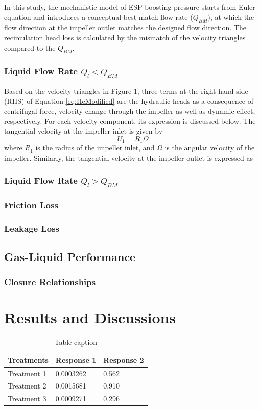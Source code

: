 \documentclass[preprint,12pt]{elsarticle}
\begin{document}
In this study, the mechanistic model of ESP boosting pressure starts from Euler equation and introduces a conceptual best match flow rate ($Q_{BM}$), at which the flow direction at the impeller outlet matches the designed flow direction. The recirculation head loss is calculated by the mismatch of the velocity triangles compared to the $Q_{BM}$.

\subsubsection{Liquid Flow Rate $Q_l < Q_{BM}$}
Based on the velocity triangles in Figure 1, three terms at the right-hand side (RHS) of Equation \ref{eq:HeModified} are the hydraulic heads as a consequence of centrifugal force, velocity change through the impeller as well as dynamic effect, respectively. For each velocity component, its expression is discussed below. The tangential velocity at the impeller inlet is given by
\begin{equation}
    \label{eq:U1}
    U_1=R_1\Omega
\end{equation}
where $R_1$ is the radius of the impeller inlet, and $\Omega$ is the angular velocity of the impeller. Similarly, the tangential velocity at the impeller outlet is expressed as
\subsubsection{Liquid Flow Rate $Q_l > Q_{BM}$}

\subsubsection{Friction Loss}
\subsubsection{Leakage Loss}
\subsection{Gas-Liquid Performance}
\subsubsection{Closure Relationships}

\section{Results and Discussions}
\begin{table}[h]
    \centering
    \begin{tabular}{l l l}
    \hline
    \textbf{Treatments} & \textbf{Response 1} & \textbf{Response 2}\\
    \hline
    Treatment 1 & 0.0003262 & 0.562 \\
    Treatment 2 & 0.0015681 & 0.910 \\
    Treatment 3 & 0.0009271 & 0.296 \\
    \hline
    \end{tabular}
    \caption{Table caption}
    \end{table}
\end{document}
